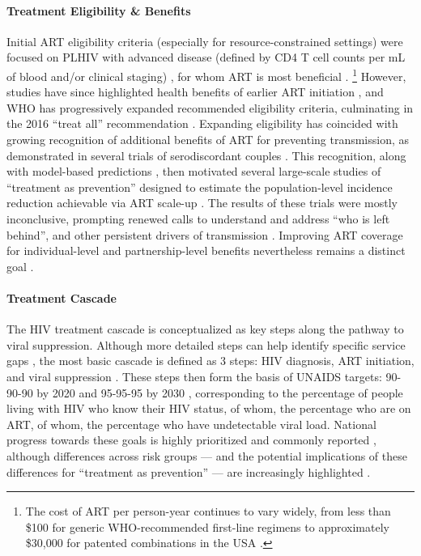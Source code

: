 \paragraph{Treatment Eligibility \& Benefits}
Initial ART eligibility criteria (especially for resource-constrained settings)
were focused on PLHIV with advanced disease
(defined by CD4 T cell counts per mL of blood and/or clinical staging) \cite{WHO2003art},
for whom ART is most beneficial \cite{Gabillard2013,Maartens2014}.%
\footnote{The cost of ART per person-year continues to vary widely,
from less than \$100 for generic WHO-recommended first-line regimens
to approximately \$30,000 for patented combinations in the USA \cite{MSF2016ART}.}
However, studies have since highlighted health benefits of earlier ART initiation
\cite{Cohen2011art,Grinsztejn2014,Lundgren2015,Danel2015},
and WHO has progressively expanded recommended eligibility criteria,
culminating in the 2016 ``treat all'' recommendation
\cite{WHO2003art,WHO2007art,WHO2013art,WHO2016art}.
Expanding eligibility has coincided with growing recognition of
additional benefits of ART for preventing transmission,
as demonstrated in several trials of serodiscordant couples
\cite{Anglemyer2013,Cohen2016,Rodger2019}.
This recognition, along with model-based predictions \cite{Granich2009,Eaton2012},
then motivated several large-scale studies of ``treatment as prevention''
designed to estimate the population-level incidence reduction achievable via ART scale-up
\cite{Havlir2019,Hayes2019,Iwuji2018}.
The results of these trials were mostly inconclusive,
prompting renewed calls to understand and address ``who is left behind'',
and other persistent drivers of transmission \cite{Akullian2017,Eisinger2019tk,Baral2019,Havlir2020}.
Improving ART coverage for individual-level and partnership-level benefits
nevertheless remains a distinct goal \cite{959595}.
\paragraph{Treatment Cascade}
The HIV treatment cascade is conceptualized as key steps along the pathway to viral suppression.
Although more detailed steps can help identify specific service gaps \cite{Mountain2014exp},
the most basic cascade is defined as 3 steps:
HIV diagnosis, ART initiation, and viral suppression \cite{909090}.
These steps then form the basis of UNAIDS targets:
\mbox{90-90-90} by 2020 \cite{909090} and \mbox{95-95-95} by 2030 \cite{959595},
corresponding to the percentage of people living with HIV who know their HIV status,
of whom, the percentage who are on ART,
of whom, the percentage who have undetectable viral load.
National progress towards these goals is highly prioritized and commonly reported \cite{AIDSinfo},
although differences across risk groups
--- and the potential implications of these differences for ``treatment as prevention'' ---
are increasingly highlighted \cite{Akullian2017,Hakim2018,Green2020}.
